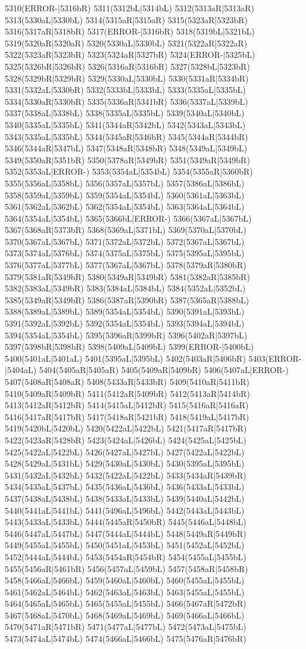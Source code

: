 5310(ERROR-|5316bR) 5311(5312bL|5314bL) 5312(5313aR|5313aR) 5313(5330aL|5330bL) 5314(5315aR|5315aR) 5315(5323aR|5323bR) 5316(5317aR|5318bR) 5317(ERROR-|5316bR) 5318(5319bL|5321bL) 5319(5320aR|5320aR) 5320(5330aL|5330bL) 5321(5322aR|5322aR) 5322(5323aR|5323bR) 5323(5324aR|5327bR) 5324(ERROR-|5325bL) 5325(5326bR|5326bR) 5326(5316aR|5316bR) 5327(5328bL|5323bR) 5328(5329bR|5329bR) 5329(5330aL|5330bL) 5330(5331aR|5334bR) 5331(5332aL|5330bR) 5332(5333bL|5333bL) 5333(5335aL|5335bL) 5334(5330aR|5330bR) 5335(5336aR|5341bR) 5336(5337aL|5339bL) 5337(5338aL|5338bL) 5338(5335aL|5335bL) 5339(5340aL|5340bL) 5340(5335aL|5335bL) 5341(5344aR|5342bL) 5342(5343aL|5343bL) 5343(5335aL|5335bL) 5344(5345aR|5346bR) 5345(5344aR|5344bR) 5346(5344aR|5347bL) 5347(5348aR|5348bR) 5348(5349aL|5349bL) 5349(5350aR|5351bR) 5350(5378aR|5349bR) 5351(5349aR|5349bR) 5352(5353aL|ERROR-) 5353(5354aL|5354bL) 5354(5355aR|5360bR) 5355(5356aL|5358bL) 5356(5357aL|5357bL) 5357(5386aL|5386bL) 5358(5359aL|5359bL) 5359(5354aL|5354bL) 5360(5361aL|5363bL) 5361(5362aL|5362bL) 5362(5354aL|5354bL) 5363(5364aL|5364bL) 5364(5354aL|5354bL) 5365(5366bL|ERROR-) 5366(5367aL|5367bL) 5367(5368aR|5373bR) 5368(5369aL|5371bL) 5369(5370aL|5370bL) 5370(5367aL|5367bL) 5371(5372aL|5372bL) 5372(5367aL|5367bL) 5373(5374aL|5376bL) 5374(5375aL|5375bL) 5375(5395aL|5395bL) 5376(5377aL|5377bL) 5377(5367aL|5367bL) 5378(5379aR|5380bR) 5379(5381aR|5349bR) 5380(5349aR|5349bR) 5381(5382aR|5385bR) 5382(5383aL|5349bR) 5383(5384aL|5384bL) 5384(5352aL|5352bL) 5385(5349aR|5349bR) 5386(5387aR|5390bR) 5387(5365aR|5388bL) 5388(5389aL|5389bL) 5389(5354aL|5354bL) 5390(5391aL|5393bL) 5391(5392aL|5392bL) 5392(5354aL|5354bL) 5393(5394aL|5394bL) 5394(5354aL|5354bL) 5395(5396aR|5399bR) 5396(5402aR|5397bL) 5397(5398bR|5398bR) 5398(5409aL|5409bL) 5399(ERROR-|5400bL) 5400(5401aL|5401aL) 5401(5395aL|5395bL) 5402(5403aR|5406bR) 5403(ERROR-|5404aL) 5404(5405aR|5405aR) 5405(5409aR|5409bR) 5406(5407aL|ERROR-) 5407(5408aR|5408aR) 5408(5433aR|5433bR) 5409(5410aR|5411bR) 5410(5409aR|5409bR) 5411(5412aR|5409bR) 5412(5413aR|5414bR) 5413(5412aR|5412bR) 5414(5415aL|5412bR) 5415(5416aR|5416aR) 5416(5417aR|5417bR) 5417(5418aR|5421bR) 5418(5419aL|5417bR) 5419(5420bL|5420bL) 5420(5422aL|5422bL) 5421(5417aR|5417bR) 5422(5423aR|5428bR) 5423(5424aL|5426bL) 5424(5425aL|5425bL) 5425(5422aL|5422bL) 5426(5427aL|5427bL) 5427(5422aL|5422bL) 5428(5429aL|5431bL) 5429(5430aL|5430bL) 5430(5395aL|5395bL) 5431(5432aL|5432bL) 5432(5422aL|5422bL) 5433(5434aR|5439bR) 5434(5435aL|5437bL) 5435(5436aL|5436bL) 5436(5433aL|5433bL) 5437(5438aL|5438bL) 5438(5433aL|5433bL) 5439(5440aL|5442bL) 5440(5441aL|5441bL) 5441(5496aL|5496bL) 5442(5443aL|5443bL) 5443(5433aL|5433bL) 5444(5445aR|5450bR) 5445(5446aL|5448bL) 5446(5447aL|5447bL) 5447(5444aL|5444bL) 5448(5449aR|5449bR) 5449(5455aL|5455bL) 5450(5451aL|5453bL) 5451(5452aL|5452bL) 5452(5444aL|5444bL) 5453(5454aR|5454bR) 5454(5455aL|5455bL) 5455(5456aR|5461bR) 5456(5457aL|5459bL) 5457(5458aR|5458bR) 5458(5466aL|5466bL) 5459(5460aL|5460bL) 5460(5455aL|5455bL) 5461(5462aL|5464bL) 5462(5463aL|5463bL) 5463(5455aL|5455bL) 5464(5465aL|5465bL) 5465(5455aL|5455bL) 5466(5467aR|5472bR) 5467(5468aL|5470bL) 5468(5469aL|5469bL) 5469(5466aL|5466bL) 5470(5471aR|5471bR) 5471(5477aL|5477bL) 5472(5473aL|5475bL) 5473(5474aL|5474bL) 5474(5466aL|5466bL) 5475(5476aR|5476bR) 